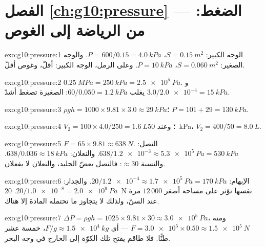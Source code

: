 \section*{الفصل \ref{ch:g10:pressure} --- الضغط: من الرياضة إلى الغوص}

\begin{solution}{exo:g10:pressure:1}
الوجه الكبير: $S = \qty{0.15}{m^2}$، $P = 600/0.15 = \qty{4.0}{kPa}$.
والوجه الصغير: $S = \qty{0.060}{m^2}$، $P = \qty{10}{kPa}$. وعلى الرمل، الوجه
الكبير:  أقلّ، وغوص أقلّ.
\end{solution}

\begin{solution}{exo:g10:pressure:2}
$\qty{0.25}{MPa} = \qty{250}{kPa} = \qty{2.5e5}{Pa}$.
و$3.0/\num{2.0e-4} = \qty{15}{kPa}$ يغلب
$60/0.050 = \qty{1.2}{kPa}$:  الصغيرة تضغط أشدّ.
\end{solution}

\begin{solution}{exo:g10:pressure:3}
$\rho g h = 1000 \times 9.81 \times 3.0 \approx \qty{29}{kPa}$؛
 $P = 101 + 29 = \qty{130}{kPa}$.
\end{solution}

\begin{solution}{exo:g10:pressure:4}
$V_2 = 100 \times 4.0 / 250 = \qty{1.6}{L}$؛
وعند \qty{50}{kPa}، $V_2 = 400/50 = \qty{8.0}{L}$.
\end{solution}

\begin{solution}{exo:g10:pressure:5}
$F = 65 \times 9.81 \approx \qty{638}{N}$. النصل:
$638/\num{1.2e-3} \approx \qty{5.3e5}{Pa} = \qty{530}{kPa}$. والنعلان:
$638/0.036 \approx \qty{18}{kPa}$. والنسبة $\approx 30$: فالنصل يعضّ
الجليد، والنعلان لا يفعلان.
\end{solution}

\begin{solution}{exo:g10:pressure:6}
الإبهام: $20/\num{1.2e-4} \approx \qty{1.7e5}{Pa} = \qty{170}{kPa}$.
والجدار: $20/\num{1.0e-8} = \qty{2.0e9}{Pa}$.  \qty{20}{N} نفسها تؤثر على
مساحة أصغر $12\,000$ مرة عند السنّ، ولذلك لا يتجاوز 
ما تحتمله المادة إلا هناك.
\end{solution}

\begin{solution}{exo:g10:pressure:7}
$\Delta P = \rho g h = 1025 \times 9.81 \times 30 \approx
\qty{3.0e5}{Pa}$، ومنه
$F = \num{3.0e5} \times 0.50 \approx \qty{1.5e5}{N}$ --- أي 
$F/g \approx \qty{1.5e4}{kg}$، خمسة عشر طنًّا. فلا طاقم يفتح تلك الكوّة
إلى الخارج في وجه البحر.
\end{solution}

